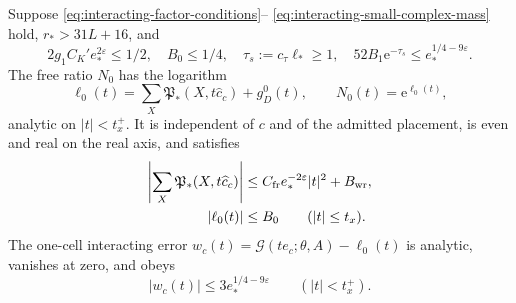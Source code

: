 \documentclass[11pt,letterpaper,reqno]{amsart}
\begin{document}
\begin{proposition}\label{prop:interacting-one-cell}
Suppose \eqref{eq:interacting-factor-conditions}--%
\eqref{eq:interacting-small-complex-mass} hold,
$r_*>31L+16$, and
\begin{equation}\label{eq:interacting-one-cell-conditions}
 2g_1C_K'e_*^{2\varepsilon}\le1/2,\quad
 B_0\le1/4,\quad
 \tau_s:=c_\tau\ell_*\ge1,\quad
 52B_1\mathrm e^{-\tau_s}\le e_*^{1/4-9\varepsilon}.
\end{equation}
The free ratio $N_0$ has the logarithm
\begin{equation}\label{eq:interacting-one-cell-free-log}
 \ell_0(t)=\sum_X\mathfrak P_*(X,t\widehat c_c)+g_D^0(t),
 \qquad N_0(t)=\mathrm e^{\ell_0(t)} ,
\end{equation}
analytic on $|t|<t_x^+$. It is independent of
$c$ and of the admitted placement, is even
and real on the real axis, and satisfies
\begin{align}
 \left|\sum_X\mathfrak P_*(X,t\widehat c_c)\right|
        &\le C_{\rm fr}e_*^{-2\varepsilon}|t|^2+B_{\rm wr},
                                  \label{eq:interacting-P-probe-gain}\\
 |\ell_0(t)|&\le B_0\qquad(|t|\le t_x).
                                  \label{eq:interacting-free-log-bound}
\end{align}
The one-cell interacting error
$w_c(t)=\mathcal G(te_c;\theta,A)-\ell_0(t)$
is analytic, vanishes at zero, and obeys
\begin{equation}\label{eq:interacting-one-cell-error}
 |w_c(t)|\le3e_*^{1/4-9\varepsilon}
                         \qquad(|t|<t_x^+).
\end{equation}
\end{proposition}
\end{document}
